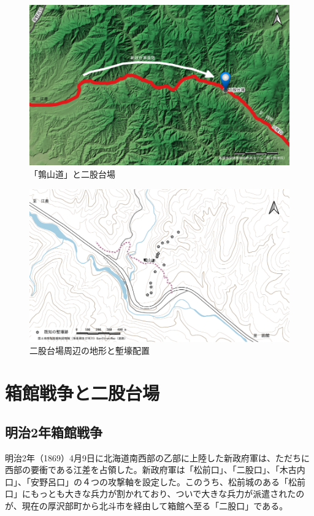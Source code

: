 \documentclass[14Q]{jsarticle}
\begin{document}
\begin{figure}[h]
\centering
\includegraphics[width=160truemm]{fig/oonoassabu.pdf}
\caption{「鶉山道」と二股台場}
\label{oonoassabu}
\end{figure}

\begin{figure}[h]
\centering
\includegraphics[width=160truemm]{fig/haitizu.pdf}
\caption{二股台場周辺の地形と塹壕配置}
\label{haiti}
\end{figure}

\section{箱館戦争と二股台場}
\subsection{明治2年箱館戦争}
明治2年（1869）4月9日に北海道南西部の乙部に上陸した新政府軍は、ただちに西部の要衝である江差を占領した。新政府軍は「松前口」、「二股口」、「木古内口」、「安野呂口」の４つの攻撃軸を設定した。このうち、松前城のある「松前口」にもっとも大きな兵力が割かれており、ついで大きな兵力が派遣されたのが、現在の厚沢部町から北斗市を経由して箱館へ至る「二股口」である。
\end{document}
